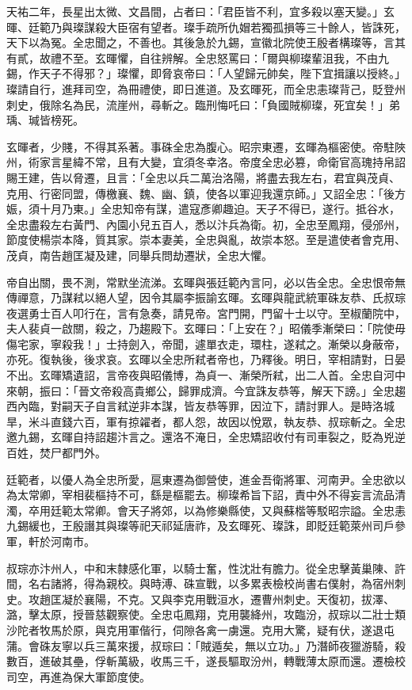 \begin{pinyinscope}
 天祐二年，長星出太微、文昌間，占者曰：「君臣皆不利，宜多殺以塞天變。」玄暉、廷範乃與璨謀殺大臣宿有望者。璨手疏所仇媢若獨孤損等三十餘人，皆誅死，天下以為冤。全忠聞之，不善也。其後急於九錫，宣徽北院使王殷者構璨等，言其有貳，故禮不至。玄暉懼，自往辨解。全忠怒罵曰：「爾與柳璨輩沮我，不由九錫，作天子不得邪？」璨懼，即脅哀帝曰：「人望歸元帥矣，陛下宜揖讓以授終。」璨請自行，進拜司空，為冊禮使，即日進道。及玄暉死，而全忠恚璨背己，貶登州刺史，俄除名為民，流崖州，尋斬之。臨刑悔吒曰：「負國賊柳璨，死宜矣！」弟瑀、瑊皆榜死。



 玄暉者，少賤，不得其系著。事硃全忠為腹心。昭宗東遷，玄暉為樞密使。帝駐陜州，術家言星緯不常，且有大變，宜須冬幸洛。帝度全忠必篡，命衛官高瑰持帛詔賜王建，告以脅遷，且言：「全忠以兵二萬治洛陽，將盡去我左右，君宜與茂貞、克用、行密同盟，傳檄襄、魏、幽、鎮，使各以軍迎我還京師。」又詔全忠：「後方娠，須十月乃東。」全忠知帝有謀，遣寇彥卿趣迫。天子不得已，遂行。抵谷水，全忠盡殺左右黃門、內園小兒五百人，悉以汴兵為衛。初，全忠至鳳翔，侵邠州，節度使楊崇本降，質其家。崇本妻美，全忠與亂，故崇本怒。至是遣使者會克用、茂貞，南告趙匡凝及建，同舉兵問劫遷狀，全忠大懼。



 帝自出關，畏不測，常默坐流涕。玄暉與張廷範內言冋，必以告全忠。全忠恨帝無傳禪意，乃謀弒以絕人望，因令其屬李振諭玄暉。玄暉與龍武統軍硃友恭、氏叔琮夜選勇士百人叩行在，言有急奏，請見帝。宮門開，門留十士以守。至椒蘭院中，夫人裴貞一啟關，殺之，乃趨殿下。玄暉曰：「上安在？」昭儀季漸榮曰：「院使毋傷宅家，寧殺我！」士持劍入，帝聞，遽單衣走，環柱，遂弒之。漸榮以身蔽帝，亦死。復執後，後求哀。玄暉以全忠所弒者帝也，乃釋後。明日，宰相請對，日晏不出。玄暉矯遺詔，言帝夜與昭儀博，為貞一、漸榮所弒，出二人首。全忠自河中來朝，振曰：「晉文帝殺高貴鄉公，歸罪成濟。今宜誅友恭等，解天下謗。」全忠趨西內臨，對嗣天子自言弒逆非本謀，皆友恭等罪，因泣下，請討罪人。是時洛城旱，米斗直錢六百，軍有掠糴者，都人怨，故因以悅眾，執友恭、叔琮斬之。全忠邀九錫，玄暉自持詔趨汴言之。還洛不淹日，全忠矯詔收付有司車裂之，貶為兇逆百姓，焚尸都門外。



 廷範者，以優人為全忠所愛，扈東遷為御營使，進金吾衛將軍、河南尹。全忠欲以為太常卿，宰相裴樞持不可，繇是樞罷去。柳璨希旨下詔，責中外不得妄言流品清濁，卒用廷範太常卿。會天子將郊，以為修樂縣使，又與蘇楷等駁昭宗謚。全忠恚九錫緩也，王殷譖其與璨等祀天祁延唐祚，及玄暉死、璨誅，即貶廷範萊州司戶參軍，軒於河南市。



 叔琮亦汴州人，中和末隸感化軍，以騎士奮，性沈壯有膽力。從全忠擊黃巢陳、許間，名右諸將，得為親校。與時溥、硃宣戰，以多累表檢校尚書右僕射，為宿州刺史。攻趙匡凝於襄陽，不克。又與李克用戰洹水，遷曹州刺史。天復初，拔澤、潞，擊太原，授晉慈觀察使。全忠屯鳳翔，克用襲絳州，攻臨汾，叔琮以二壯士類沙陀者牧馬於原，與克用軍偕行，伺隙各禽一虜還。克用大驚，疑有伏，遂退屯蒲。會硃友寧以兵三萬來援，叔琮曰：「賊遁矣，無以立功。」乃潛師夜獵游騎，殺數百，進破其壘，俘斬萬級，收馬三千，遂長驅取汾州，轉戰薄太原而還。遷檢校司空，再進為保大軍節度使。




\end{pinyinscope}

